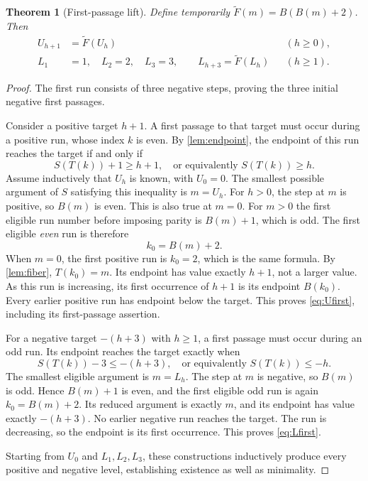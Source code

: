 \documentclass[11pt]{article}
\newtheorem{theorem}{Theorem}[section]
\theoremstyle{definition}
\numberwithin{equation}{section}
\begin{document}
\begin{theorem}[First-passage lift]\label{thm:first}
Define temporarily $\widetilde F(m)=B(B(m)+2)$. Then
\begin{align}
 U_{h+1}&=\widetilde F(U_h) &&(h\ge0),\label{eq:Ufirst}\\
 L_1&=1,\quad L_2=2,\quad L_3=3,\qquad
 L_{h+3}=\widetilde F(L_h) &&(h\ge1).\label{eq:Lfirst}
\end{align}
\end{theorem}
\begin{proof}
The first run consists of three negative steps, proving the three initial negative first passages.

Consider a positive target $h+1$. A first passage to that target must occur during a positive run, whose index $k$ is even. By \cref{lem:endpoint}, the endpoint of this run reaches the target if and only if
\[
 S(T(k))+1\ge h+1,\quad\text{or equivalently }S(T(k))\ge h.
\]
Assume inductively that $U_h$ is known, with $U_0=0$. The smallest possible argument of $S$ satisfying this inequality is $m=U_h$. For $h>0$, the step at $m$ is positive, so $B(m)$ is even. This is also true at $m=0$. For $m>0$ the first eligible run number before imposing parity is $B(m)+1$, which is odd. The first eligible \emph{even} run is therefore
\[
 k_0=B(m)+2.
\]
When $m=0$, the first positive run is $k_0=2$, which is the same formula. By \cref{lem:fiber}, $T(k_0)=m$. Its endpoint has value exactly $h+1$, not a larger value. As this run is increasing, its first occurrence of $h+1$ is its endpoint $B(k_0)$. Every earlier positive run has endpoint below the target. This proves \eqref{eq:Ufirst}, including its first-passage assertion.

For a negative target $-(h+3)$ with $h\ge1$, a first passage must occur during an odd run. Its endpoint reaches the target exactly when
\[
 S(T(k))-3\le-(h+3),\quad\text{or equivalently }S(T(k))\le-h.
\]
The smallest eligible argument is $m=L_h$. The step at $m$ is negative, so $B(m)$ is odd. Hence $B(m)+1$ is even, and the first eligible odd run is again $k_0=B(m)+2$. Its reduced argument is exactly $m$, and its endpoint has value exactly $-(h+3)$. No earlier negative run reaches the target. The run is decreasing, so the endpoint is its first occurrence. This proves \eqref{eq:Lfirst}.

Starting from $U_0$ and $L_1,L_2,L_3$, these constructions inductively produce every positive and negative level, establishing existence as well as minimality.
\end{proof}
\end{document}
